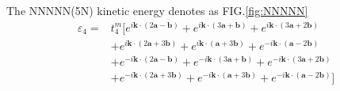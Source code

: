 \documentclass[reprint, aps, prb, showkeys]{revtex4-2}
\begin{document}
The NNNNN(5N) kinetic energy denotes as FIG.\ref{fig:NNNNN}
\begin{equation}
\begin{aligned}
    \varepsilon_4 = &t_4^m[e^{i \boldsymbol{k} \cdot (2\boldsymbol{a} - \boldsymbol{b})} + e^{i \boldsymbol{k} \cdot (3\boldsymbol{a} + \boldsymbol{b})} + e^{i \boldsymbol{k} \cdot (3\boldsymbol{a} + 2\boldsymbol{b})} \\
     &+ e^{i \boldsymbol{k} \cdot (2\boldsymbol{a} + 3\boldsymbol{b})} + e^{i \boldsymbol{k} \cdot (\boldsymbol{a} + 3\boldsymbol{b})} + e^{-i \boldsymbol{k} \cdot (\boldsymbol{a} - 2\boldsymbol{b})} \\
     &+ e^{-i \boldsymbol{k} \cdot (2\boldsymbol{a} - \boldsymbol{b})} + e^{-i \boldsymbol{k} \cdot (3\boldsymbol{a} + \boldsymbol{b})} + e^{-i \boldsymbol{k} \cdot (3\boldsymbol{a} + 2\boldsymbol{b})} \\
     &+ e^{-i \boldsymbol{k} \cdot (2\boldsymbol{a} + 3\boldsymbol{b})} + e^{-i \boldsymbol{k} \cdot (\boldsymbol{a} + 3\boldsymbol{b})} + e^{-i \boldsymbol{k} \cdot (\boldsymbol{a} - 2\boldsymbol{b})}]
\end{aligned}
\end{equation}
\end{document}
